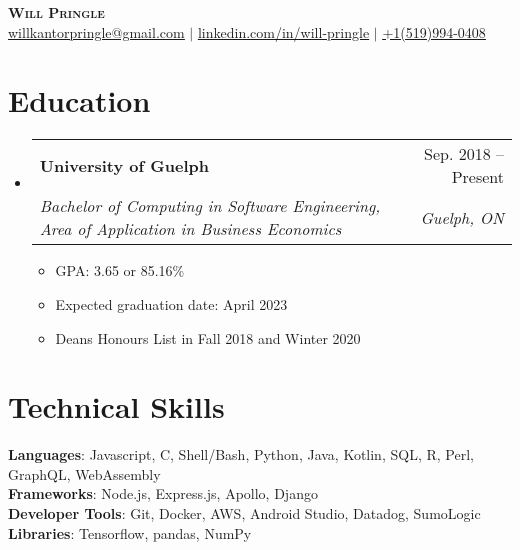 \documentclass[letterpaper,11pt]{article}
\makeatletter
\newcommand{\resumeItem}[1]{
  \item\small{
    {#1 \vspace{-2pt}}
  }
}
\newcommand{\resumeSubheading}[4]{
  \vspace{-2pt}\item
    \begin{tabular*}{0.97\textwidth}[t]{l@{\extracolsep{\fill}}r}
      \textbf{#1} & #2 \\
      \textit{\small#3} & \textit{\small #4} \\
    \end{tabular*}\vspace{-7pt}
}
\newcommand{\resumeSubHeadingListStart}{\begin{itemize}[leftmargin=0.15in, label={}]}
\newcommand{\resumeSubHeadingListEnd}{\end{itemize}}
\newcommand{\resumeItemListStart}{\begin{itemize}}
\newcommand{\resumeItemListEnd}{\end{itemize}\vspace{-5pt}}
\makeatother
\begin{document}

\begin{center}
    \textbf{\Huge \scshape Will Pringle} \\ \vspace{1pt}
    \small \href{mailto:willkantorpringle@gmail.com}{\underline{willkantorpringle@gmail.com}} $|$ 
    \href{https://www.linkedin.com/in/will-pringle/}{\underline{linkedin.com/in/will-pringle}} $|$
    \href{tel:+15199940408}{\underline{+1(519)994-0408}}
    
\end{center}


\section{Education}
  \resumeSubHeadingListStart
    \resumeSubheading
      {University of Guelph}{Sep. 2018 -- Present}
      {Bachelor of Computing in Software Engineering, Area of Application in Business Economics}{Guelph, ON}
      \resumeItemListStart
            \resumeItem{GPA: 3.65 or 85.16\%}
            \resumeItem{Expected graduation date: April 2023}
            \resumeItem{Deans Honours List in Fall 2018 and Winter 2020}
      \resumeItemListEnd
  \resumeSubHeadingListEnd
  
\section{Technical Skills}
 \begin{itemize}[leftmargin=0.15in, label={}]
    \small{\item{
     \textbf{Languages}{: Javascript, C, Shell/Bash, Python, Java, Kotlin, SQL, R, Perl, GraphQL, WebAssembly} \\
     \textbf{Frameworks}{: Node.js, Express.js, Apollo, Django} \\
     \textbf{Developer Tools}{: Git, Docker, AWS, Android Studio, Datadog, SumoLogic} \\
     \textbf{Libraries}{: Tensorflow, pandas, NumPy} \\
    }}
 \end{itemize}
  
\end{document}
